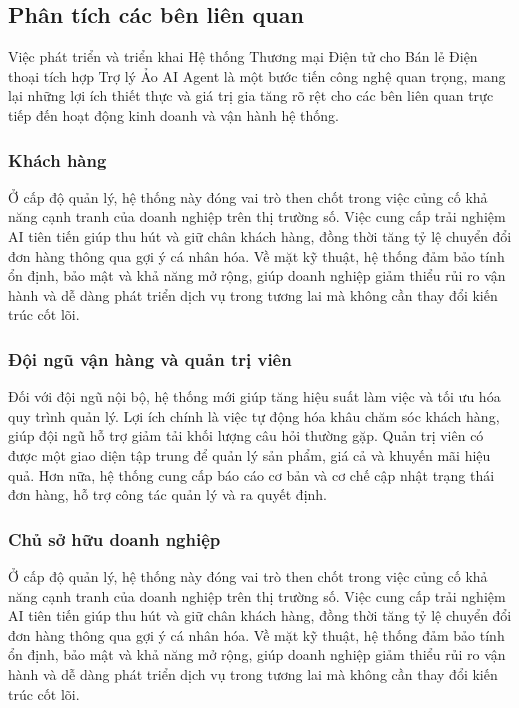 \subsection{Phân tích các bên liên quan}

Việc phát triển và triển khai Hệ thống Thương mại Điện tử cho Bán lẻ Điện thoại tích hợp Trợ lý Ảo AI Agent là một bước tiến công nghệ quan trọng, mang lại những lợi ích thiết thực và giá trị gia tăng rõ rệt cho các bên liên quan trực tiếp đến hoạt động kinh doanh và vận hành hệ thống. 

\subsubsection{Khách hàng}

Ở cấp độ quản lý, hệ thống này đóng vai trò then chốt trong việc củng cố khả năng cạnh tranh của doanh nghiệp trên thị trường số. Việc cung cấp trải nghiệm AI tiên tiến giúp thu hút và giữ chân khách hàng, đồng thời tăng tỷ lệ chuyển đổi đơn hàng thông qua gợi ý cá nhân hóa. Về mặt kỹ thuật, hệ thống đảm bảo tính ổn định, bảo mật và khả năng mở rộng, giúp doanh nghiệp giảm thiểu rủi ro vận hành và dễ dàng phát triển dịch vụ trong tương lai mà không cần thay đổi kiến trúc cốt lõi.

\subsubsection{Đội ngũ vận hàng và quản trị viên}

Đối với đội ngũ nội bộ, hệ thống mới giúp tăng hiệu suất làm việc và tối ưu hóa quy trình quản lý. Lợi ích chính là việc tự động hóa khâu chăm sóc khách hàng, giúp đội ngũ hỗ trợ giảm tải khối lượng câu hỏi thường gặp. Quản trị viên có được một giao diện tập trung để quản lý sản phẩm, giá cả và khuyến mãi hiệu quả. Hơn nữa, hệ thống cung cấp báo cáo cơ bản và cơ chế cập nhật trạng thái đơn hàng, hỗ trợ công tác quản lý và ra quyết định.

\subsubsection{Chủ sở hữu doanh nghiệp}

Ở cấp độ quản lý, hệ thống này đóng vai trò then chốt trong việc củng cố khả năng cạnh tranh của doanh nghiệp trên thị trường số. Việc cung cấp trải nghiệm AI tiên tiến giúp thu hút và giữ chân khách hàng, đồng thời tăng tỷ lệ chuyển đổi đơn hàng thông qua gợi ý cá nhân hóa. Về mặt kỹ thuật, hệ thống đảm bảo tính ổn định, bảo mật và khả năng mở rộng, giúp doanh nghiệp giảm thiểu rủi ro vận hành và dễ dàng phát triển dịch vụ trong tương lai mà không cần thay đổi kiến trúc cốt lõi.

